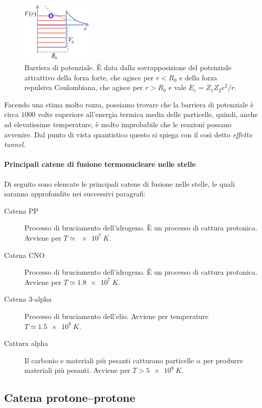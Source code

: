 \begin{figure}
    \centering
    \includegraphics[width=0.3\textwidth]{immagini/barriera-potenziale.png}
    \caption{Barriera di potenziale. È data dalla sovrapposizione del potenziale attrattivo della forza forte, che agisce per $r < R_0$ e della forza repulsiva Coulombiana, che agisce per $r > R_0$ e vale $E_c = Z_1 Z_2 e^2 / r$.}
    \label{fig:barriera-potenziale}
\end{figure}

Facendo una stima molto rozza, possiamo trovare che la barriera di potenziale è circa $1000$ volte superiore all'energia termica media delle particelle, quindi, anche ad elevatissime temperature, è molto improbabile che le reazioni possano avvenire. Dal punto di vista quantistico questo si spiega con il così detto \emph{effetto tunnel}.

\paragraph{Principali catene di fusione termonucleare nelle stelle}
Di seguito sono elencate le principali catene di fusione nelle stelle, le quali saranno approfondite nei successivi paragrafi:
\begin{description}
    \item[Catena PP] Processo di bruciamento dell'idrogeno. È un processo di cattura protonica. Avviene per $T \simeq \SI{e7}{K}$.
    \item[Catena CNO] Processo di bruciamento dell'idrogeno. È un processo di cattura protonica. Avviene per $T \simeq \SI{1.8e7}{K}$.
    \item[Catena 3-alpha] Processo di bruciamento dell'elio. Avviene per temperature $T \simeq \SI{1.5e8}{K}$.
    \item[Cattura alpha] Il carbonio e materiali più pesanti catturano particelle $\alpha$ per produrre materiali più pesanti. Avviene per $T > \SI{5e8}{K}$.
\end{description}

\subsection{Catena protone--protone}\label{sec:catena-pp}
